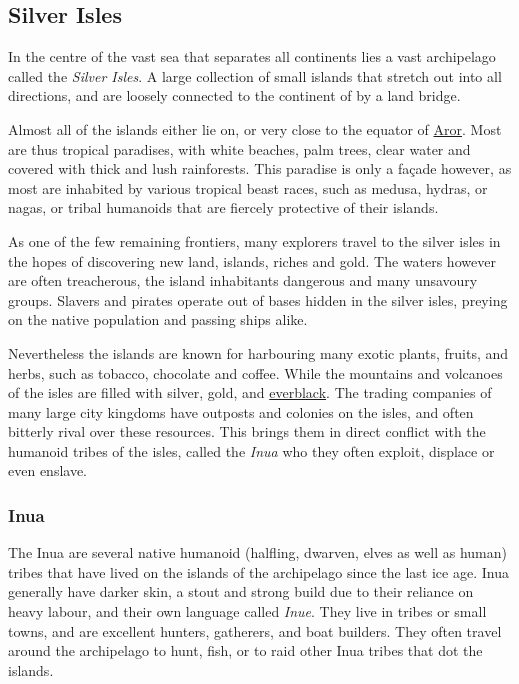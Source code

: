 \subsection{Silver Isles}
\label{sec:Silver Isles}

In the centre of the vast sea that separates all continents lies a vast
archipelago called the \emph{Silver Isles}. A large collection of small
islands that stretch out into all directions, and are loosely connected to the
continent of  by a land bridge.

Almost all of the islands either lie on, or very close to the equator of
\hyperref[sec:Aror]{Aror}. Most are thus tropical paradises, with white
beaches, palm trees, clear water and covered with thick and lush
rainforests. This paradise is only a façade however, as most are inhabited by
various tropical beast races, such as medusa, hydras, or nagas, or tribal
humanoids that are fiercely protective of their islands.

As one of the few remaining frontiers, many explorers travel to the silver
isles in the hopes of discovering new land, islands, riches and gold. The
waters however are often treacherous, the island inhabitants dangerous and
many unsavoury groups. Slavers and pirates operate out of bases hidden in
the silver isles, preying on the native population and passing ships alike.

Nevertheless the islands are known for harbouring many exotic plants, fruits,
and herbs, such as tobacco, chocolate and coffee. While the mountains and
volcanoes of the isles are filled with silver, gold, and
\hyperref[sec:Everblack]{everblack}. The trading companies of many large city
kingdoms have outposts and colonies on the isles, and often bitterly rival
over these resources. This brings them in direct conflict with the humanoid
tribes of the isles, called the \emph{Inua} who they often exploit, displace
or even enslave.

\subsubsection{Inua}
\label{sec:Inua}

The Inua are several native humanoid (halfling, dwarven, elves as well as
human) tribes that have lived on the islands of the archipelago since the last
ice age. Inua generally have darker skin, a stout and strong build due to their
reliance on heavy labour, and their own language called \emph{Inue}. They live
in tribes or small towns, and are excellent hunters, gatherers, and boat
builders. They often travel around the archipelago to hunt, fish, or to raid
other Inua tribes that dot the islands.


